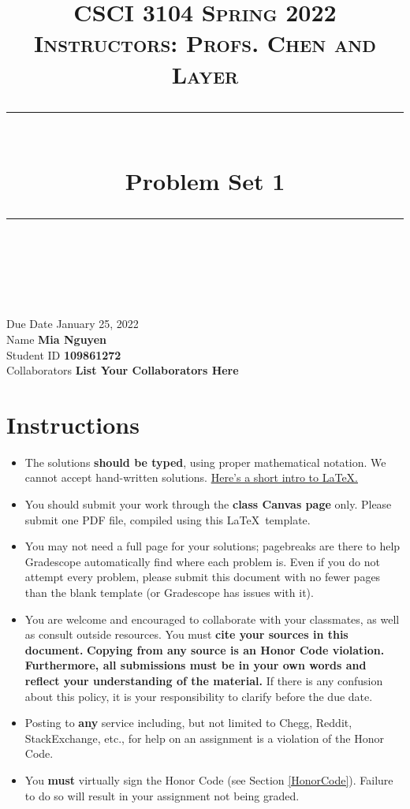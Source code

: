 \documentclass[11pt]{article}
\title{
\normalfont \normalsize 
\textsc{CSCI 3104 Spring 2022 \\ 
Instructors: Profs. Chen and Layer} \\
[10pt] 
\rule{\linewidth}{0.5pt} \\[6pt] 
\huge Problem Set 1 \\
\rule{\linewidth}{2pt}  \\[10pt]
}
\date{}
\theoremstyle{definition}
\theoremstyle{definition}
\theoremstyle{definition}
\begin{document}

\maketitle


\noindent
Due Date \dotfill January 25, 2022 \\
Name \dotfill \textbf{Mia Nguyen} \\
Student ID \dotfill \textbf{109861272} \\
Collaborators \dotfill \textbf{List Your Collaborators Here}

\tableofcontents

\section{Instructions}
 \begin{itemize}
	\item The solutions \textbf{should be typed}, using proper mathematical notation. We cannot accept hand-written solutions. \href{http://ece.uprm.edu/~caceros/latex/introduction.pdf}{Here's a short intro to \LaTeX.}
	\item You should submit your work through the \textbf{class Canvas page} only. Please submit one PDF file, compiled using this \LaTeX \ template.
	\item You may not need a full page for your solutions; pagebreaks are there to help Gradescope automatically find where each problem is. Even if you do not attempt every problem, please submit this document with no fewer pages than the blank template (or Gradescope has issues with it).

	\item You are welcome and encouraged to collaborate with your classmates, as well as consult outside resources. You must \textbf{cite your sources in this document.} \textbf{Copying from any source is an Honor Code violation. Furthermore, all submissions must be in your own words and reflect your understanding of the material.} If there is any confusion about this policy, it is your responsibility to clarify before the due date. 

	\item Posting to \textbf{any} service including, but not limited to Chegg, Reddit, StackExchange, etc., for help on an assignment is a violation of the Honor Code.

	\item You \textbf{must} virtually sign the Honor Code (see Section \ref{HonorCode}). Failure to do so will result in your assignment not being graded.
\end{itemize}
\end{document}
